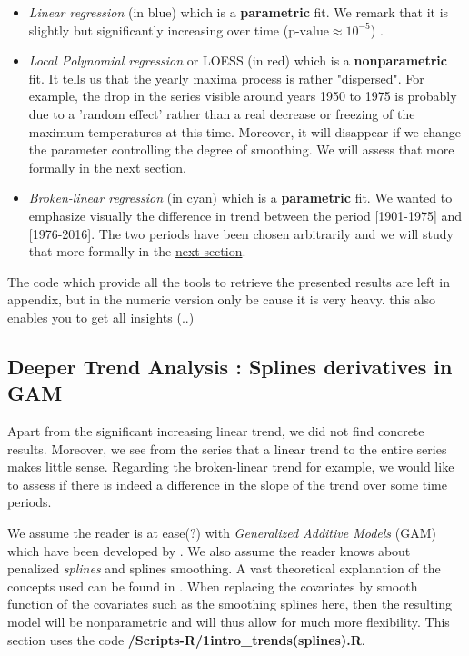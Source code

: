 \begin{itemize}
\item \emph{Linear regression } (in blue) which is a \textbf{parametric} fit. We remark that it is slightly but significantly increasing over time ($\text{p-value}\approx 10^{-5}$) . 
\item \emph{Local Polynomial regression } or LOESS (in red) which is a \textbf{nonparametric} fit. It tells us that the yearly maxima process is rather "dispersed". For example, the drop in the series visible around years 1950 to 1975 is probably due to a 'random effect' rather than a real decrease or freezing of the maximum temperatures at this time. Moreover, it will disappear if we change the parameter controlling the degree of smoothing. We will assess that more formally in the \hyperref[sec:splines]{next section}.
\item \emph{Broken-linear regression} (in cyan) which is a \textbf{parametric} fit. We wanted to emphasize visually the difference in trend between the period [1901-1975] and [1976-2016]. The two periods have been chosen arbitrarily and we will study that more formally in the \hyperref[sec:splines]{next section}.
\end{itemize}


The code which provide all the tools to retrieve the presented results are left in appendix, but in the numeric version only be cause it is very heavy. this also enables you to get all insights (..)



\subsection{Deeper Trend Analysis : Splines derivatives in GAM}\label{sec:splines}

Apart from the significant increasing linear trend, we did not find concrete results. Moreover, we see from the series that a linear trend to the entire series makes little sense. Regarding the broken-linear trend for example, we would like to assess if there is indeed a difference in the slope of the trend over some time periods. 

We assume the reader is at ease(?) with\emph{ Generalized Additive Models} (GAM) which have been developed by \citet{hastie_generalized_1986}. We also assume the reader knows about penalized \emph{splines} and splines smoothing. A vast theoretical explanation of the concepts used can be found in \citet[chapter 3, 6 and 11]{ruppert_semiparametric_2003}. When replacing the covariates by smooth function of the covariates such as the smoothing splines here, then the resulting model will be nonparametric and will thus allow for much more flexibility.
 This section uses the code \textbf{/Scripts-R/1intro\_trends(splines).R}.


